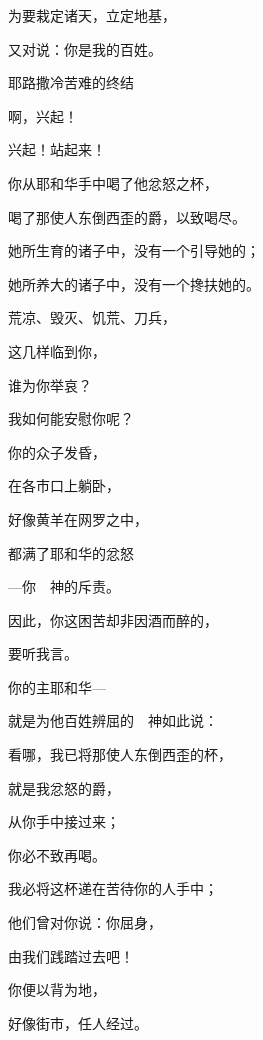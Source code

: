 {\par }{\Q 为要栽定诸天，立定地基，
\par }{\Q 又对{}说：你是我的百姓。
\par }{\SH 耶路撒冷苦难的终结
\par }{\Q {}啊，兴起！
\par }{\Q 兴起！站起来！
\par }{\Q 你从耶和华手中喝了他忿怒之杯，
\par }{\Q 喝了那使人东倒西歪的爵，以致喝尽。
\par }{\Q {}她所生育的诸子中，没有一个引导她的；
\par }{\Q 她所养大的诸子中，没有一个搀扶她的。
\par }{\Q {}荒凉、毁灭、饥荒、刀兵，
\par }{\Q 这几样临到你，
\par }{\Q 谁为你举哀？
\par }{\Q 我如何能安慰你呢？
\par }{\Q {}你的众子发昏，
\par }{\Q 在各市口上躺卧，
\par }{\Q 好像黄羊在网罗之中，
\par }{\Q 都满了耶和华的忿怒
\par }{\Q —你　神的斥责。
\par }{\Q {}因此，你这困苦却非因酒而醉的，
\par }{\Q 要听我言。
\par }{\Q {}你的主耶和华—
\par }{\Q 就是为他百姓辨屈的　神如此说：
\par }{\Q 看哪，我已将那使人东倒西歪的杯，
\par }{\Q 就是我忿怒的爵，
\par }{\Q 从你手中接过来；
\par }{\Q 你必不致再喝。
\par }{\BB \par }{\Q {}我必将这杯递在苦待你的人手中；
\par }{\Q 他们曾对你说：你屈身，
\par }{\Q 由我们践踏过去吧！
\par }{\Q 你便以背为地，
\par }{\Q 好像街市，任人经过。

}
